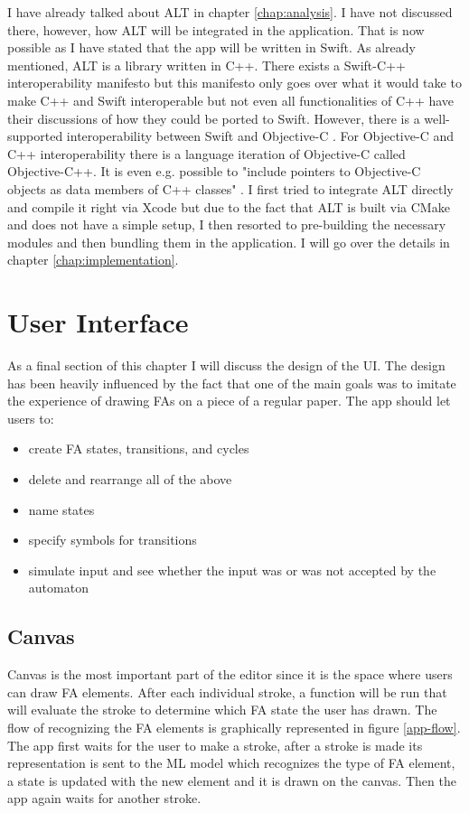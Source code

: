 I have already talked about ALT in chapter \ref{chap:analysis}. I have not discussed there, however, how ALT will be integrated in the application. That is now possible as I have stated that the app will be written in Swift. As already mentioned, ALT is a library written in C++. There exists a Swift-C++ interoperability manifesto \cite{swift-c++-manifesto} but this manifesto only goes over what it would take to make C++ and Swift interoperable but not even all functionalities of C++ have their discussions of how they could be ported to Swift. However, there is a well-supported interoperability between Swift and Objective-C \cite{swift-objc-interoperability}. For Objective-C and C++ interoperability there is a language iteration of Objective-C called Objective-C++. It is even e.g. possible to "include pointers to Objective-C objects as data members of C++ classes" \cite{objc++}. I first tried to integrate ALT directly and compile it right via Xcode but due to the fact that ALT is built via CMake \cite{cmake} and does not have a simple setup, I then resorted to pre-building the necessary modules and then bundling them in the application. I will go over the details in chapter \ref{chap:implementation}.

\section{User Interface}

As a final section of this chapter I will discuss the design of the UI. The design has been heavily influenced by the fact that one of the main goals was to imitate the experience of drawing FAs on a piece of a regular paper. The app should let users to:
\begin{itemize}
    \item create FA states, transitions, and cycles
    \item delete and rearrange all of the above
    \item name states
    \item specify symbols for transitions
    \item simulate input and see whether the input was or was not accepted by the automaton
\end{itemize}

\subsection{Canvas}

Canvas is the most important part of the editor since it is the space where users can draw FA elements. After each individual stroke, a function will be run that will evaluate the stroke to determine which FA state the user has drawn. The flow of recognizing the FA elements is graphically represented in figure \ref{app-flow}. The app first waits for the user to make a stroke, after a stroke is made its representation is sent to the ML model which recognizes the type of FA element, a state is updated with the new element and it is drawn on the canvas. Then the app again waits for another stroke.

